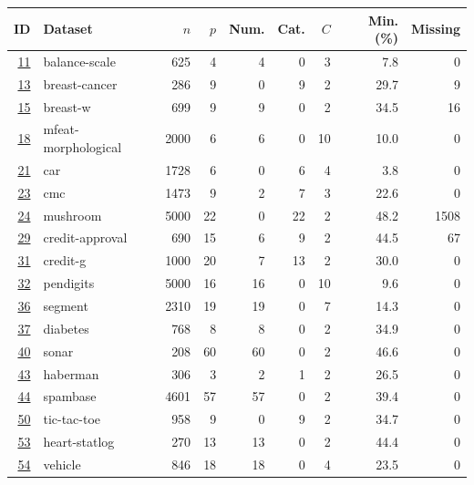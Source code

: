 \begin{tabular}{rlrrrrrrr}
\toprule
ID & Dataset & $n$ & $p$ & Num. & Cat. & $C$ & Min. (\%) & Missing \\
\midrule
\href{https://www.openml.org/d/11}{11} & balance-scale & 625 & 4 & 4 & 0 & 3 & 7.8 & 0 \\
\href{https://www.openml.org/d/13}{13} & breast-cancer & 286 & 9 & 0 & 9 & 2 & 29.7 & 9 \\
\href{https://www.openml.org/d/15}{15} & breast-w & 699 & 9 & 9 & 0 & 2 & 34.5 & 16 \\
\href{https://www.openml.org/d/18}{18} & mfeat-morphological & 2000 & 6 & 6 & 0 & 10 & 10.0 & 0 \\
\href{https://www.openml.org/d/21}{21} & car & 1728 & 6 & 0 & 6 & 4 & 3.8 & 0 \\
\href{https://www.openml.org/d/23}{23} & cmc & 1473 & 9 & 2 & 7 & 3 & 22.6 & 0 \\
\href{https://www.openml.org/d/24}{24} & mushroom & 5000 & 22 & 0 & 22 & 2 & 48.2 & 1508 \\
\href{https://www.openml.org/d/29}{29} & credit-approval & 690 & 15 & 6 & 9 & 2 & 44.5 & 67 \\
\href{https://www.openml.org/d/31}{31} & credit-g & 1000 & 20 & 7 & 13 & 2 & 30.0 & 0 \\
\href{https://www.openml.org/d/32}{32} & pendigits & 5000 & 16 & 16 & 0 & 10 & 9.6 & 0 \\
\href{https://www.openml.org/d/36}{36} & segment & 2310 & 19 & 19 & 0 & 7 & 14.3 & 0 \\
\href{https://www.openml.org/d/37}{37} & diabetes & 768 & 8 & 8 & 0 & 2 & 34.9 & 0 \\
\href{https://www.openml.org/d/40}{40} & sonar & 208 & 60 & 60 & 0 & 2 & 46.6 & 0 \\
\href{https://www.openml.org/d/43}{43} & haberman & 306 & 3 & 2 & 1 & 2 & 26.5 & 0 \\
\href{https://www.openml.org/d/44}{44} & spambase & 4601 & 57 & 57 & 0 & 2 & 39.4 & 0 \\
\href{https://www.openml.org/d/50}{50} & tic-tac-toe & 958 & 9 & 0 & 9 & 2 & 34.7 & 0 \\
\href{https://www.openml.org/d/53}{53} & heart-statlog & 270 & 13 & 13 & 0 & 2 & 44.4 & 0 \\
\href{https://www.openml.org/d/54}{54} & vehicle & 846 & 18 & 18 & 0 & 4 & 23.5 & 0 \\
\bottomrule
\end{tabular}
